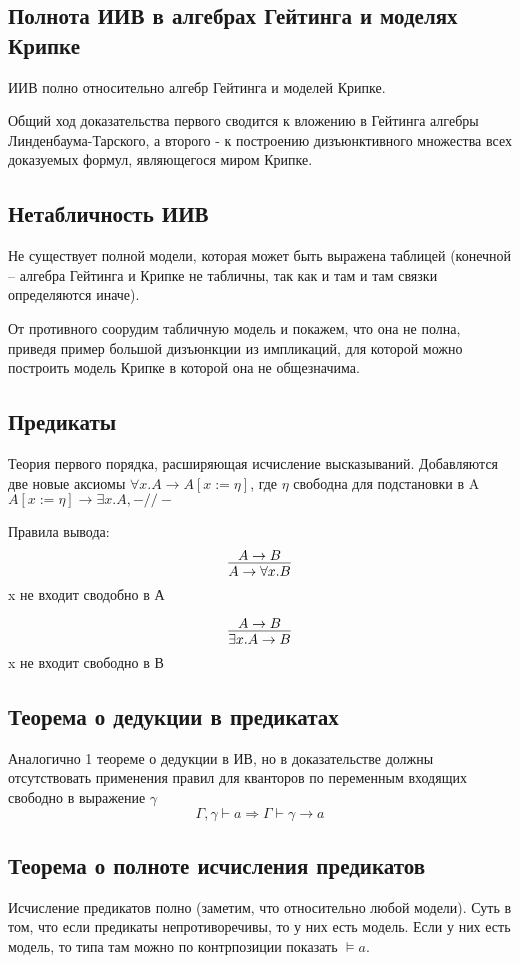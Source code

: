 \subsection{Полнота ИИВ в алгебрах Гейтинга и моделях Крипке}
\label{sec-2-13}
ИИВ полно относительно алгебр Гейтинга и моделей Крипке.

Общий ход доказательства первого сводится к вложению
в Гейтинга алгебры Линденбаума-Тарского, а второго -
к построению дизъюнктивного множества всех доказуемых
формул, являющегося миром Крипке.
\subsection{Нетабличность ИИВ}
\label{sec-2-14}
Не существует полной модели, которая может быть выражена таблицей
(конечной -- алгебра Гейтинга и Крипке не табличны, так как и там и
там связки определяются иначе).

От противного соорудим табличную модель и покажем, что она не полна,
приведя пример большой дизъюнкции из импликаций, для которой можно
построить модель Крипке в которой она не общезначима.
\subsection{Предикаты}
\label{sec-2-15}
Теория первого порядка, расширяющая исчисление высказываний.
Добавляются две новые аксиомы
$\forall x.A \to A[x:=\eta]$, где $\eta$ свободна для подстановки в A
$A[x:=\eta] \to \exists x.A, -//-$

Правила вывода:
\[\infer{A \to \forall x . B}{A \to B}\]
 x не входит сводобно в А

\[\infer{\exists x . A \to B}{A \to B}\]
 x не входит свободно в В
\subsection{Теорема о дедукции в предикатах}
\label{sec-2-16}
Аналогично 1 теореме о дедукции в ИВ, но в доказательстве должны
отсутствовать применения правил для кванторов по переменным входящих
свободно в выражение $\gamma$
\[\Gamma, \gamma \vdash a \Rightarrow \Gamma \vdash \gamma \to a\]
\subsection{Теорема о полноте исчисления предикатов}
\label{sec-2-17}
Исчисление предикатов полно (заметим, что относительно любой модели).
Суть в том, что если предикаты непротиворечивы, то у них есть модель.
Если у них есть модель, то типа там можно по контрпозиции показать $\vDash a$.
